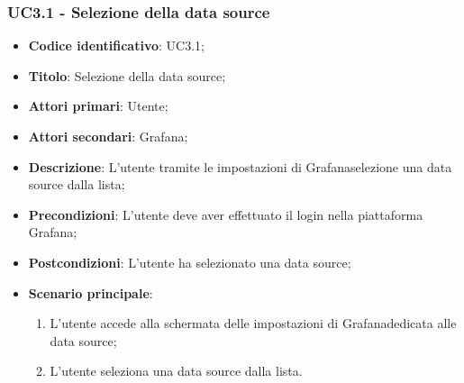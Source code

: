     \subsubsection{UC3.1 - Selezione della data source}
        \begin{itemize}
            \item \textbf{Codice identificativo}: UC3.1;
            \item \textbf{Titolo}: Selezione della data source;
            \item \textbf{Attori primari}: Utente;
            \item \textbf{Attori secondari}: Grafana\glo;
            \item \textbf{Descrizione}: L'utente tramite le impostazioni di Grafana\glosp selezione una data source dalla lista;
            \item \textbf{Precondizioni}: L'utente deve aver effettuato il login nella piattaforma Grafana\glo;
            \item \textbf{Postcondizioni}: L'utente ha selezionato una data source;
            \item \textbf{Scenario principale}:
            \begin{enumerate}
                \item L'utente accede alla schermata delle impostazioni di Grafana\glosp dedicata alle data source;
                \item L'utente seleziona una data source dalla lista.
            \end{enumerate}
        \end{itemize}
